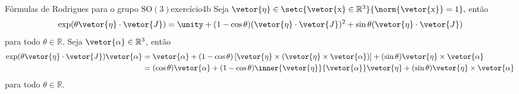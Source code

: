 \begin{proposition}{Fórmulas de Rodrigues para o grupo \(\mathrm{SO}(3)\)}{exercício4b}
    Seja \(\vetor{\eta} \in \setc{\vetor{\mathrm{x}}\in \mathbb{R}^3}{\norm{\vetor{\mathrm{x}}} = 1},\) então
    \begin{equation*}
        \exp(\theta \vetor{\eta}\cdot \vetor{J}) = \unity + (1 - \cos\theta) (\vetor{\eta}\cdot \vetor{J})^2 + \sin\theta (\vetor{\eta}\cdot \vetor{J})
    \end{equation*}
    para todo \(\theta \in \mathbb{R}\). Seja \(\vetor{\alpha} \in \mathbb{R}^3\), então
    \begin{align*}
        \exp(\theta \vetor{\eta}\cdot \vetor{J})\vetor{\alpha} &= \vetor{\alpha} + (1 - \cos\theta) \left[\vetor{\eta} \times (\vetor{\eta} \times \vetor{\alpha})\right] + (\sin\theta)\vetor{\eta}\times \vetor{\alpha}\\&=(\cos\theta)\vetor{\alpha} + (1 - \cos\theta) \inner{\vetor{\eta}}{\vetor{\alpha}}\vetor{\eta} +(\sin\theta)\vetor{\eta}\times \vetor{\alpha}
    \end{align*}
    para todo \(\theta \in \mathbb{R}\).
\end{proposition}
